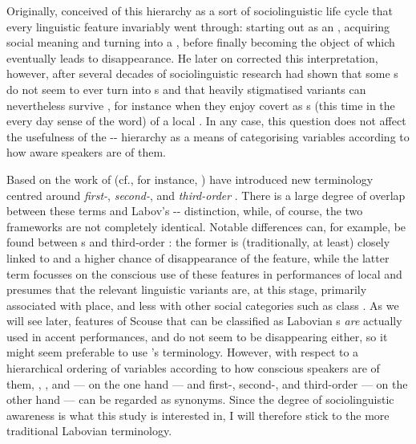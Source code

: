 Originally, \citeauthor{labov1972} conceived of this hierarchy as a sort of sociolinguistic life cycle that every linguistic feature invariably went through: starting out as an , acquiring social meaning and turning into a , before finally becoming the object of  which eventually leads to disappearance.
He later on corrected this interpretation, however, after several decades of sociolinguistic research had shown that some s do not seem to ever turn into s and that heavily stigmatised variants can nevertheless survive \parencite{labov1994}, for instance when they enjoy covert  as s (this time in the every day sense of the word) of a local .
In any case, this question does not affect the usefulness of the -- hierarchy as a means of categorising variables according to how aware speakers are of them.

Based on the work of \citeauthor{silverstein2003} (cf., for instance, \citealt{silverstein2003}) \textcite[cf.][78]{johnstoneetal2006} have introduced new terminology centred around \emph{first-}, \emph{second-}, and \emph{third-order }.
There is a large degree of overlap between these terms and Labov's -- distinction, while, of course, the two frameworks are not completely identical.
Notable differences can, for example, be found between s and third-order : the former is (traditionally, at least) closely linked to  and a higher chance of disappearance of the feature, while the latter term focusses on the conscious use of these features in performances of local  and presumes that the relevant linguistic variants are, at this stage, primarily associated with place, and less with other social categories such as class \parencite[cf.][81--84]{johnstoneetal2006}.
As we will see later, features of Scouse that can be classified as Labovian s \emph{are} actually used in accent performances, and do not seem to be disappearing either, so it might seem preferable to use \citeauthor{johnstoneetal2006}'s terminology.
However, with respect to a hierarchical ordering of variables according to how conscious speakers are of them, , , and  --- on the one hand --- and first-, second-, and third-order  --- on the other hand --- can be regarded as synonyms.
Since the degree of sociolinguistic awareness is what this study is interested in, I will therefore stick to the more traditional Labovian terminology.

